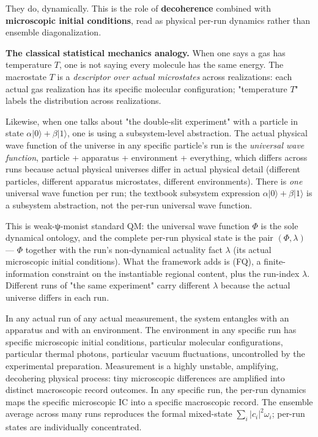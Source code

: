 \documentclass[11pt,a4paper]{article}
\begin{document}
They do, dynamically. This is the role of \textbf{decoherence} combined with \textbf{microscopic initial conditions}, read as physical per-run dynamics rather than ensemble diagonalization.

\textbf{The classical statistical mechanics analogy.} When one says a gas has temperature $T$, one is not saying every molecule has the same energy. The macrostate $T$ is a \emph{descriptor over actual microstates} across realizations: each actual gas realization has its specific molecular configuration; "temperature $T$" labels the distribution across realizations.

Likewise, when one talks about "the double-slit experiment" with a particle in state $\alpha|0\rangle + \beta|1\rangle$, one is using a subsystem-level abstraction. The actual physical wave function of the universe in any specific particle's run is the \emph{universal wave function}, particle + apparatus + environment + everything, which differs across runs because actual physical universes differ in actual physical detail (different particles, different apparatus microstates, different environments). There is \emph{one} universal wave function per run; the textbook subsystem expression $\alpha|0\rangle + \beta|1\rangle$ is a subsystem abstraction, not the per-run universal wave function.

This is weak-ψ-monist standard QM: the universal wave function $\Phi$ is the sole dynamical ontology, and the complete per-run physical state is the pair $(\Phi, \lambda)$ — $\Phi$ together with the run's non-dynamical actuality fact $\lambda$ (its actual microscopic initial conditions). What the framework adds is (FQ), a finite-information constraint on the instantiable regional content, plus the run-index $\lambda$. Different runs of "the same experiment" carry different $\lambda$ because the actual universe differs in each run.

In any actual run of any actual measurement, the system entangles with an apparatus and with an environment. The environment in any specific run has specific microscopic initial conditions, particular molecular configurations, particular thermal photons, particular vacuum fluctuations, uncontrolled by the experimental preparation. Measurement is a highly unstable, amplifying, decohering physical process: tiny microscopic differences are amplified into distinct macroscopic record outcomes. In any specific run, the per-run dynamics maps the specific microscopic IC into a specific macroscopic record. The ensemble average across many runs reproduces the formal mixed-state $\sum_i |c_i|^2 \omega_i$; per-run states are individually concentrated.
\end{document}
